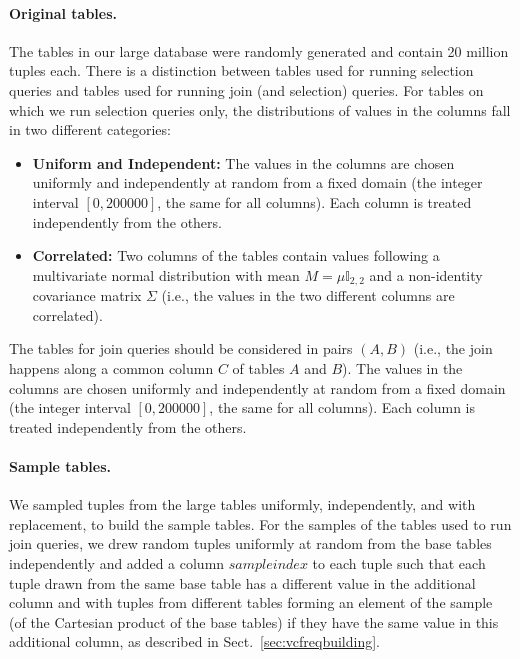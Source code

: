 \paragraph{Original tables.} The tables in our large database were randomly
generated and contain 20 million tuples each. There is a distinction between tables
used for running selection queries and tables used for running join (and
selection) queries. For tables on which we run selection queries only, the
distributions of values in the columns fall in two different categories:  
\begin{itemize}
  \item {\bf Uniform and Independent:} The values in the columns are chosen
    uniformly and independently at random from a fixed domain (the integer
    interval $[0,200000]$, the same for all columns). Each column is treated
    independently from the others. 
  \item {\bf Correlated:} Two columns of the tables contain values following a
    multivariate normal distribution with mean $M=\mu\mathbb{I}_{2,2}$ and a
    non-identity covariance matrix $\Sigma$ (i.e., the values in the two
    different columns are correlated). 
\end{itemize}
The tables for join queries should be considered in pairs $(A,B)$ (i.e., the
join happens along a common column $C$ of tables $A$ and $B$). The values in the
columns are chosen uniformly and independently at random from a fixed domain (the integer interval
$[0,200000]$, the same for all columns). Each column is treated independently
from the others. 

\paragraph{Sample tables.} We sampled tuples from the large tables uniformly,
independently, and with replacement, to build the sample tables. For the samples
of the tables used to run join queries, we drew random tuples uniformly at
random from the base tables independently and added a column $sampleindex$ to
each tuple such that each tuple drawn from the same base table has a different
value in the additional column and with tuples from different tables forming an
element of the sample (of the Cartesian product of the base tables) if they have
the same value in this additional column, as described in
Sect.~\ref{sec:vcfreqbuilding}.

